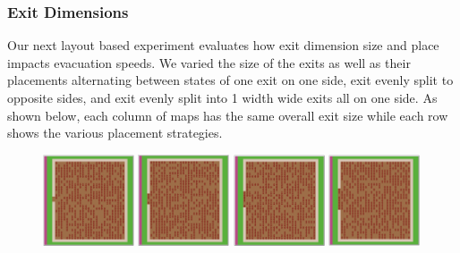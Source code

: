 \documentclass[12pt,letterpaper]{article}
\begin{document}
\subsubsection{Exit Dimensions}

Our next layout based experiment evaluates how exit dimension size and place impacts evacuation speeds.  We varied the size of the exits as well as their placements alternating between states of one exit on one side, exit evenly split to opposite sides, and exit evenly split into 1 width wide exits all on one side.  As shown below, each column of maps has the same overall exit size while each row shows the various placement strategies.

\begin{figure}[ht]
  \centering
  \begin{minipage}[b]{.75\linewidth}
    \includegraphics[width=0.24\textwidth]{./figures/exit_dims_2_a.png}
    \includegraphics[width=0.24\textwidth]{./figures/exit_dims_4_a.png}
    \includegraphics[width=0.24\textwidth]{./figures/exit_dims_6_a.png}
    \includegraphics[width=0.24\textwidth]{./figures/exit_dims_8_a.png}
  \end{minipage}

\end{figure}
\end{document}
